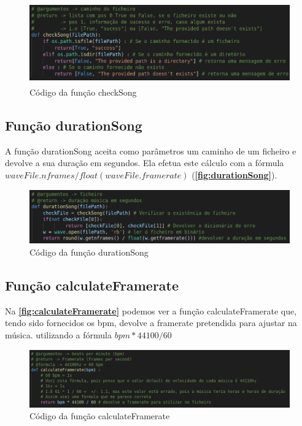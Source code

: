 \documentclass{report}
\begin{document}
\begin{figure}[!h]
\center 
\includegraphics[height=100pt]{img/checkSong.png}
\caption{Código da função checkSong}
\label{fig:checkSong}
\end{figure}

\subsection{Função durationSong}
\label{ssec:durationSong}
A função durationSong aceita como parâmetros um caminho de um ficheiro e devolve a sua duração em segundos. Ela efetua este
cálculo com a fórmula \(waveFile.nframes / float(waveFile.framerate)\) (\textbf{\autoref{fig:durationSong}}).

\begin{figure}[!h]
\center 
\includegraphics[width=330pt]{img/durationSong.png}
\caption{Código da função durationSong}
\label{fig:durationSong}
\end{figure}

\subsection{Função calculateFramerate}
\label{ssec:calculateFramerate}
Na \textbf{\autoref{fig:calculateFramerate}} podemos ver a função calculateFramerate que, tendo sido fornecidos os \ac{bpm},
devolve a framerate pretendida para ajustar na música. utilizando a fórmula \(bpm * 44100 / 60\)

\begin{figure}[!h]
\center 
\includegraphics[width=330pt]{img/calculateFramerate.png}
\caption{Código da função calculateFramerate}
\label{fig:calculateFramerate}
\end{figure}
\end{document}
